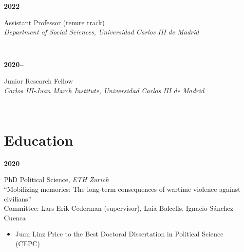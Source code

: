 \documentclass[a4paper, 12pt]{article}
\begin{document}
\begin{minipage}[t]{0.1\textwidth}
\textbf{2022--}
\end{minipage}\hfill\begin{minipage}[t]{0.9\textwidth}
Assistant Professor (tenure track)\\
\textit{Department of Social Sciences, Universidad Carlos III de Madrid}\\\vspace{-8pt}
\end{minipage}\\
\begin{minipage}[t]{0.1\textwidth}
\textbf{2020--}
\end{minipage}\hfill\begin{minipage}[t]{0.9\textwidth}
Junior Research Fellow\\
\textit{Carlos III-Juan March Institute, Universidad Carlos III de Madrid}\\\vspace{-8pt}
\end{minipage}\\

\section*{Education}

\begin{minipage}[t]{0.1\textwidth}
  \flushleft
	\textbf{2020}
\end{minipage}
\begin{minipage}[t]{0.9\textwidth}
  PhD Political Science, \textit{ETH Zurich}\\
  {\small ``Mobilizing memories: The long-term consequences of wartime violence against civilians''}\vspace{-2pt}\\
  {\small Committee: Lars-Erik Cederman (supervisor), Laia Balcells, Ignacio Sánchez-Cuenca}
	\vspace{-5pt}
	\begin{itemize}\small
	  \item Juan Linz Price to the Best Doctoral Dissertation in Political Science (CEPC)
	\end{itemize}
\end{minipage}
\end{document}
